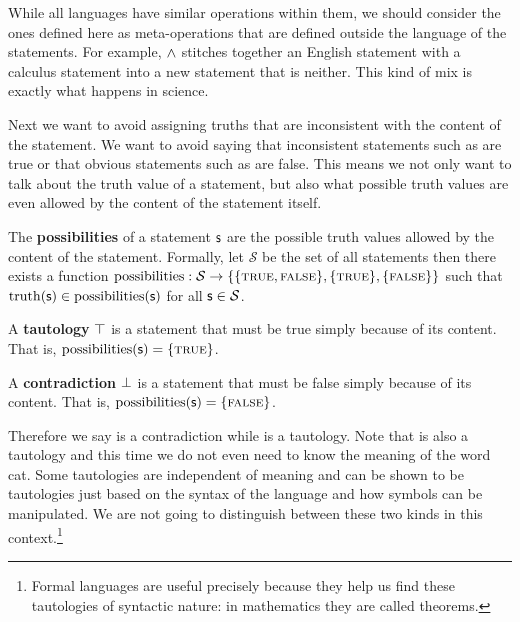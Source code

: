 \documentclass[11pt,letterpaper,fleqn]{memoir} %
\begin{document}
While all languages have similar operations within them, we should consider the ones defined here as meta-operations that are defined outside the language of the statements. For example, $\wedge$ stitches together an English statement with a calculus statement into a new statement that is neither. This kind of mix is exactly what happens in science.



Next we want to avoid assigning truths that are inconsistent with the content of the statement.  We want to avoid saying that inconsistent statements such as  are true or that obvious statements such as  are false. This means we not only want to talk about the truth value of a statement, but also what possible truth values are even allowed by the content of the statement itself.

\begin{mathSection}
	
	\begin{defn}\label{def_possibilities}
		The \textbf{possibilities} of a statement $\mathsf{s}$ are the possible truth values allowed by the content of the statement. Formally, let $\mathcal{S}$ be the set of all statements then there exists a function $\operatorname{possibilities}: \mathcal{S} \to \{\{\textsc{true}, \textsc{false}\},\{\textsc{true}\},\{\textsc{false}\}\}$ such that $\operatorname{truth}(\mathsf{s}) \in \operatorname{possibilities}(\mathsf{s})$ for all $\mathsf{s} \in \mathcal{S}$.
	\end{defn}
	
	\begin{defn}
		A \textbf{tautology} $\top$ is a statement that must be true simply because of its content. That is, $\operatorname{possibilities}(\mathsf{s}) = \{\textsc{true}\}$.
	\end{defn}
	
	\begin{defn}
		A \textbf{contradiction} $\bot$ is a statement that must be false simply because of its content. That is, $\operatorname{possibilities}(\mathsf{s}) = \{\textsc{false}\}$.
	\end{defn}
	
\end{mathSection}

Therefore we say  is a contradiction while  is a tautology. Note that  is also a tautology and this time we do not even need to know the meaning of the word cat. Some tautologies are independent of meaning and can be shown to be tautologies just based on the syntax of the language and how symbols can be manipulated. We are not going to distinguish between these two kinds in this context.\footnote{Formal languages are useful precisely because they help us find these tautologies of syntactic nature: in mathematics they are called theorems.}
\end{document}
